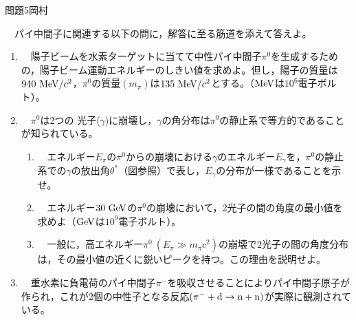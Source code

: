 \documentclass[fleqn]{jbook}
\begin{document}

\begin{question}{問題5}{岡村}
\setcounter{equation}{0}

　パイ中間子に関連する以下の問に，解答に至る筋道を添えて答えよ。

\begin{enumerate}

  \item 　陽子ビームを水素ターゲットに当てて中性パイ中間子$\pi^0$を生成するための，陽子ビーム運動エネルギーのしきい値を求めよ。但し，陽子の質量は$940~{\rm MeV}/c^2$，$\pi^0$の質量$(m_\pi)$は$135~{\rm MeV}/c^2$とする。（${\rm MeV}$は$10^6$電子ボルト）。\\
  
    \item 　$\pi^0$は2つの%
    光子($\gamma$)に崩壊し，$\gamma$の角分布は$\pi^0$の静止系で等方的であることが知られている。\\
  
  \begin{enumerate}
  
    \item 　エネルギー$E_\pi$の$\pi^0$からの崩壊における$\gamma$のエネルギー$E_\gamma$を，$\pi^0$の静止系での$\gamma$の放出角$\theta^*$（図参照）で表し，$E_\gamma$の分布が一様であることを示せ。\\
    
    \item 　エネルギー$30~{\rm GeV}$の$\pi^0$の崩壊において，2光子の間の角度の最小値を求めよ（${\rm GeV}$は$10^9$電子ボルト）。\\
    
    \item 　一般に，高エネルギー$\pi^0~\left( E_\pi \gg m_\pi c^2 \right)$の崩壊で2光子の間の角度分布は，その最小値の近くに鋭いピークを持つ。この理由を説明せよ。\\

\end{enumerate}

  \item 　重水素に負電荷のパイ中間子$\pi^-$を吸収させることによりパイ中間子原子が作られ，これが2個の中性子となる反応$\left( \pi^- + {\rm d} \to {\rm n} + {\rm n}\right)$が実際に観測されている。\\
  

\end{enumerate}
\end{question}
\end{document}

